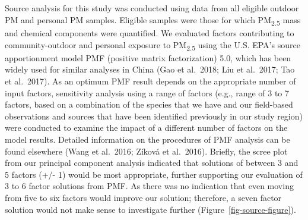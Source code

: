 \documentclass[
  letterpaper,
  DIV=11,
  numbers=noendperiod]{scrartcl}
\providecommand{\DIFadd}[1]{{\protect\color{blue}\uwave{#1}}} %
\providecommand{\DIFaddbegin}{} %
\providecommand{\DIFaddend}{} %
\providecommand{\DIFdelbegin}{} %
\providecommand{\DIFdelend}{} %
\newcommand{\DIFscaledelfig}{0.5}
\newlength{\DIFdelgraphicswidth} %
\newlength{\DIFdelgraphicsheight} %
\newcommand{\DIFaddincludegraphics}[2][]{{\color{blue}\fbox{\DIFOincludegraphics[#1]{#2}}}} %
\newcommand{\DIFdelincludegraphics}[2][]{%
\sbox{\DIFdelgraphicsbox}{\DIFOincludegraphics[#1]{#2}}%
\settoboxwidth{\DIFdelgraphicswidth}{\DIFdelgraphicsbox} %
\settoboxtotalheight{\DIFdelgraphicsheight}{\DIFdelgraphicsbox} %
\scalebox{\DIFscaledelfig}{%
\parbox[b]{\DIFdelgraphicswidth}{\usebox{\DIFdelgraphicsbox}\\[-\baselineskip] \rule{\DIFdelgraphicswidth}{0em}}\llap{\resizebox{\DIFdelgraphicswidth}{\DIFdelgraphicsheight}{%
\setlength{\unitlength}{\DIFdelgraphicswidth}%
\begin{picture}(1,1)%
\thicklines\linethickness{2pt} %
{\color[rgb]{1,0,0}\put(0,0){\framebox(1,1){}}}%
{\color[rgb]{1,0,0}\put(0,0){\line( 1,1){1}}}%
{\color[rgb]{1,0,0}\put(0,1){\line(1,-1){1}}}%
\end{picture}%
}\hspace*{3pt}}} %
} %
\DeclareRobustCommand{\DIFaddbegin}{\DIFOaddbegin \let\includegraphics\DIFaddincludegraphics} %
\DeclareRobustCommand{\DIFaddend}{\DIFOaddend \let\includegraphics\DIFOincludegraphics} %
\DeclareRobustCommand{\DIFdelbegin}{\DIFOdelbegin \let\includegraphics\DIFdelincludegraphics} %
\DeclareRobustCommand{\DIFdelend}{\DIFOaddend \let\includegraphics\DIFOincludegraphics} %
\begin{document}
\DIFdelbegin %
\DIFdelend \DIFaddbegin \subsection{\DIFadd{Aim 2: Source
contributions}}\label{aim-2-source-contributions}
\DIFaddend 

Source analysis for this study was conducted using data from all
eligible outdoor PM and personal PM samples. Eligible samples were those
for which PM\textsubscript{2.5} mass and chemical components were
quantified. We evaluated factors contributing to community-outdoor and
personal exposure to PM\textsubscript{2.5} using the U.S. EPA's source
apportionment model PMF (positive matrix factorization) 5.0, which has
been widely used for similar analyses in China (Gao et al.~2018; Liu et
al.~2017; Tao et al.~2017). As an optimum PMF result depends on the
appropriate number of input factors, sensitivity analysis using a range
of factors (e.g., range of 3 to 7 factors, based on a combination of the
species that we have and our field-based observations and sources that
have been identified previously in our study region) were conducted to
examine the impact of a different number of factors on the model
results. Detailed information on the procedures of PMF analysis can be
found elsewhere (Wang et al.~2016; Zíková et al.~2016). Briefly, the
scree plot from our principal component analysis indicated that
solutions of between 3 and 5 factors (+/- 1) would be most appropriate,
further supporting our evaluation of 3 to 6 factor solutions from PMF.
As there was no indication that even moving from five to six factors
would improve our solution; therefore, a seven factor solution would not
make sense to investigate further (Figure~\ref{fig-source-figure}).
\end{document}
